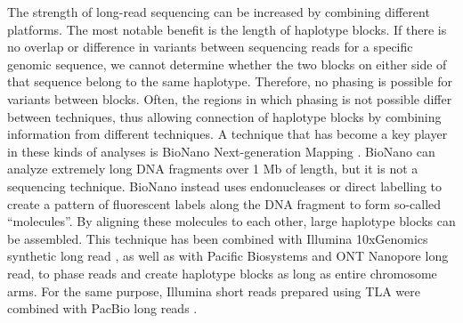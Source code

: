 The strength of long-read sequencing can be increased by combining different platforms. 
The most notable benefit is the length of haplotype blocks. 
If there is no overlap or difference in variants between sequencing reads for a specific genomic sequence, we cannot determine whether the two blocks on either side of that sequence belong to the same haplotype. Therefore, no phasing is possible for variants between blocks. Often, the regions in which phasing is not possible differ between techniques, thus allowing connection of haplotype blocks by combining information from
different techniques. 
A technique that has become a key player in these kinds of analyses is BioNano Next-generation Mapping \cite{Bionanogenomics_2018}. 
BioNano can analyze extremely long DNA fragments over 1 Mb of length, but it is not a sequencing technique. 
BioNano instead uses endonucleases or direct labelling to create a pattern of fluorescent labels along the DNA fragment to form so-called “molecules”. By aligning these molecules to each other, large haplotype blocks can be assembled. 
This technique has been combined with Illumina 10xGenomics synthetic long read \cite{Mostovoy_2016, Levy_Sakin_2019}, as well as with Pacific Biosystems \cite{Pendleton_2015} and ONT Nanopore \cite{Ma_2018} long read, to phase reads and create haplotype blocks as long as entire chromosome arms. 
For the same purpose, Illumina short reads prepared using TLA were combined with PacBio long reads \cite{Lawrence_2016}.


